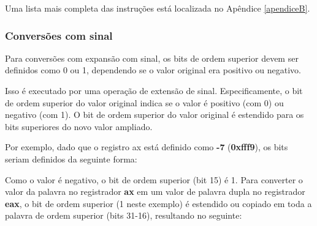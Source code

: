 Uma lista mais completa das instruções está localizada no Apêndice \ref{apendiceB}.

\subsubsection{Conversões com sinal}
Para conversões com expansão com sinal, os bits de ordem superior devem ser definidos como 0 ou 1, dependendo se o valor original era positivo ou negativo.

Isso é executado por uma operação de extensão de sinal. Especificamente, o bit de ordem superior do valor original indica se o valor é positivo (com 0) ou negativo (com 1). O bit de ordem superior do valor original é estendido para os bits superiores do novo valor ampliado.

Por exemplo, dado que o registro ax está definido como \textbf{-7} (\textbf{0xfff9}), os bits seriam definidos da seguinte forma:

\begin{center}
\end{center}

Como o valor é negativo, o bit de ordem superior (bit 15) é 1. Para converter o valor da palavra no registrador \textbf{ax} em um valor de palavra dupla no registrador \textbf{eax}, o bit de ordem superior (1 neste exemplo) é estendido ou copiado em toda a palavra de ordem superior (bits 31-16), resultando no seguinte:

\begin{center}
\end{center}

